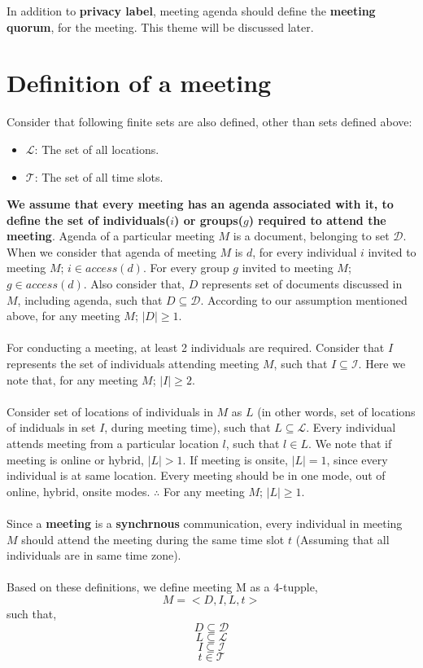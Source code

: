 \documentclass{article}
\begin{document}
\noindent
In addition to \textbf{privacy label}, meeting agenda should define the \textbf{meeting quorum}, for the meeting. This theme will be discussed later.

\section{Definition of a meeting}
\noindent
Consider that following finite sets are also defined, other than sets defined above:
\begin{itemize}
    \item $\mathcal{L}$: The set of all locations.
    \item $\mathcal{T}$: The set of all time slots.\\
\end{itemize}
\noindent
\textbf{We assume that every meeting has an agenda associated with it, to define the set of individuals($i$) or groups($g$) required to attend the meeting}. Agenda of a particular meeting $M$ is a document, belonging to set $\mathcal{D}$.\\
When we consider that agenda of meeting $M$ is $d$, for every individual $i$ invited to meeting $M$; $i \in access(d)$. For every group $g$ invited to meeting $M$; $g \in access(d)$. Also consider that, $D$ represents set of documents discussed in $M$, including agenda, such that $D \subseteq \mathcal{D}$. According to our assumption mentioned above, for any meeting $M$; $|D| \geq 1$.\\ \\ 
For conducting a meeting, at least 2 individuals are required. Consider that $I$ represents the set of individuals attending meeting $M$, such that $I \subseteq \mathcal{I}$. Here we note that, for any meeting $M$; $|I| \geq 2$.\\ \\  
Consider set of locations of individuals in $M$ as $L$ (in other words, set of locations of indiduals in set $I$, during meeting time), such that $L \subseteq \mathcal{L}$. Every individual attends meeting from a particular location $l$, such that $l \in L$. We note that if meeting is online or hybrid, $|L| > 1$. If meeting is onsite, $|L| = 1$, since every individual is at same location. Every meeting should be in one mode, out of online, hybrid, onsite modes. $\therefore$ For any meeting $M$; $|L| \geq 1$. \\ \\
Since a \textbf{meeting} is a \textbf{synchrnous} communication, every individual in meeting $M$ should attend the meeting during the same time slot $t$ (Assuming that all individuals are in same time zone).  \\ \\
Based on these definitions, we define meeting M as a 4-tupple,
    \[ M = < D, I, L, t > \]
such that,
    \[ D \subseteq \mathcal{D} \]
    \[ L \subseteq \mathcal{L} \]
    \[ I \subseteq \mathcal{I} \]
    \[ t \in \mathcal{T} \]
\end{document}
